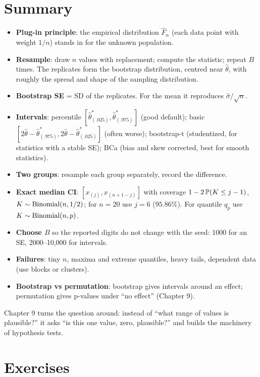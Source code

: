 \section{Summary}
\label{sec:boot-summary}

\begin{itemize}
  \item \textbf{Plug-in principle}: the empirical distribution $\hat F_n$ (each
  data point with weight $1/n$) stands in for the unknown population.
  \item \textbf{Resample}: draw $n$ values with replacement; compute the
  statistic; repeat $B$ times. The replicates form the bootstrap distribution,
  centred near $\hat\theta$, with roughly the spread and shape of the sampling
  distribution.
  \item \textbf{Bootstrap SE} = SD of the replicates. For the mean it
  reproduces $\hat\sigma/\sqrt n$.
  \item \textbf{Intervals}: percentile $[\hat\theta^*_{(.025)}, \hat\theta^*_{(.975)}]$
  (good default); basic $[2\hat\theta - \hat\theta^*_{(.975)}, 2\hat\theta - \hat\theta^*_{(.025)}]$
  (often worse); bootstrap-t (studentized, for statistics with a stable SE);
  BCa (bias and skew corrected, best for smooth statistics).
  \item \textbf{Two groups}: resample each group separately, record the
  difference.
  \item \textbf{Exact median CI}: $[x_{(j)}, x_{(n+1-j)}]$ with coverage
  $1 - 2\P(K \le j-1)$, $K \sim \Bin(n, 1/2)$; for $n=20$ use $j=6$
  ($95.86\%$). For quantile $q_p$ use $K \sim \Bin(n, p)$.
  \item \textbf{Choose $B$} so the reported digits do not change with the seed:
  1000 for an SE, 2000--10{,}000 for intervals.
  \item \textbf{Failures}: tiny $n$, maxima and extreme quantiles, heavy tails,
  dependent data (use blocks or clusters).
  \item \textbf{Bootstrap vs permutation}: bootstrap gives intervals around an
  effect; permutation gives p-values under ``no effect'' (Chapter 9).
\end{itemize}

Chapter 9 turns the question around: instead of ``what range of values is
plausible?'' it asks ``is this one value, zero, plausible?'' and builds the
machinery of hypothesis tests.

\section{Exercises}
\label{sec:boot-exercises}

